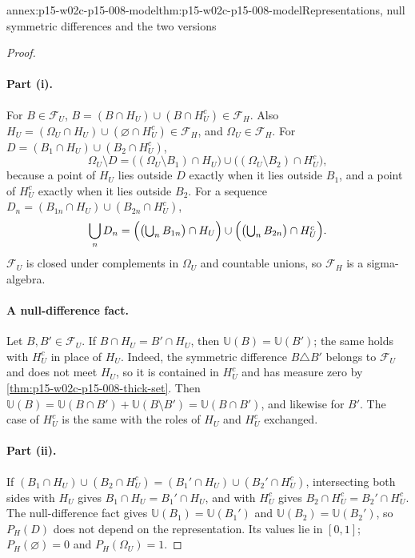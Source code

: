 \begin{annexitem}{annex:p15-w02c-p15-008-model}{thm:p15-w02c-p15-008-model}{Representations, null symmetric differences and the two versions}
\begin{proof}
\paragraph{Part (i).}
For \(B\in\mathcal F_U\), \(B=(B\cap H_U)\cup(B\cap H_U^c)\in\mathcal F_H\).
Also \(H_U=(\Omega_U\cap H_U)\cup(\varnothing\cap H_U^c)\in\mathcal F_H\),
and \(\Omega_U\in\mathcal F_H\). For
\(D=(B_1\cap H_U)\cup(B_2\cap H_U^c)\),
\[
 \Omega_U\setminus D=\bigl((\Omega_U\setminus B_1)\cap H_U\bigr)
                     \cup\bigl((\Omega_U\setminus B_2)\cap H_U^c\bigr),
\]
because a point of \(H_U\) lies outside \(D\) exactly when it lies
outside \(B_1\), and a point of \(H_U^c\) exactly when it lies outside
\(B_2\). For a sequence \(D_n=(B_{1n}\cap H_U)\cup(B_{2n}\cap H_U^c)\),
\[
 \bigcup_nD_n=\Bigl(\bigl(\textstyle\bigcup_nB_{1n}\bigr)\cap H_U\Bigr)
              \cup\Bigl(\bigl(\textstyle\bigcup_nB_{2n}\bigr)\cap H_U^c\Bigr).
\]
\(\mathcal F_U\) is closed under complements in \(\Omega_U\) and countable
unions, so \(\mathcal F_H\) is a sigma-algebra.

\paragraph{A null-difference fact.}
Let \(B,B'\in\mathcal F_U\). If \(B\cap H_U=B'\cap H_U\), then
\(\mathbb U(B)=\mathbb U(B')\); the same holds with \(H_U^c\) in place of
\(H_U\). Indeed, the symmetric difference \(B\triangle B'\) belongs to
\(\mathcal F_U\) and does not meet \(H_U\), so it is contained in
\(H_U^c\) and has measure zero by
\cref{thm:p15-w02c-p15-008-thick-set}. Then
\(\mathbb U(B)=\mathbb U(B\cap B')+\mathbb U(B\setminus B')
=\mathbb U(B\cap B')\), and likewise for \(B'\). The case of \(H_U^c\) is
the same with the roles of \(H_U\) and \(H_U^c\) exchanged.

\paragraph{Part (ii).}
If \((B_1\cap H_U)\cup(B_2\cap H_U^c)=(B_1'\cap H_U)\cup(B_2'\cap H_U^c)\),
intersecting both sides with \(H_U\) gives \(B_1\cap H_U=B_1'\cap H_U\),
and with \(H_U^c\) gives \(B_2\cap H_U^c=B_2'\cap H_U^c\). The
null-difference fact gives \(\mathbb U(B_1)=\mathbb U(B_1')\) and
\(\mathbb U(B_2)=\mathbb U(B_2')\), so \(P_H(D)\) does not depend on the
representation. Its values lie in \([0,1]\); \(P_H(\varnothing)=0\) and
\(P_H(\Omega_U)=1\).


\end{proof}
\end{annexitem}
